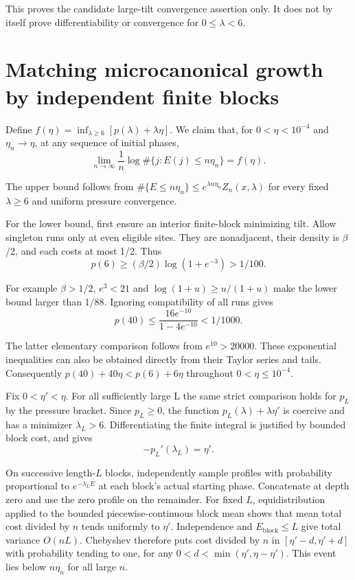 \documentclass[11pt,letterpaper]{article}
\begin{document}
This proves the candidate large-tilt convergence assertion only. It does not by itself prove differentiability or convergence for $0\le\lambda<6$.

\section{Matching microcanonical growth by independent finite blocks}

Define $f(\eta)=\inf_{\lambda\ge6}[p(\lambda)+\lambda\eta]$. We claim that, for $0<\eta<10^{-4}$ and $\eta_n\to\eta$, at any sequence of initial phases,
\[
\lim_{n\to\infty}\frac1n\log\#\{j:E(j)\le n\eta_n\}=f(\eta).
\]

The upper bound follows from $\#\{E\le n\eta_n\}\le e^{\lambda n\eta_n}Z_n(x,\lambda)$ for every fixed $\lambda\ge6$ and uniform pressure convergence.

For the lower bound, first ensure an interior finite-block minimizing tilt. Allow singleton runs only at even eligible sites. They are nonadjacent, their density is $\beta$/2, and each costs at most 1/2. Thus
\[
p(6)\ge(\beta/2)\log(1+e^{-3})>1/100.
\]

For example $\beta>1/2$, $e^3<21$ and $\log(1+u)\ge u/(1+u)$ make the lower bound larger than 1/88. Ignoring compatibility of all runs gives
\[
p(40)\le\frac{16e^{-10}}{1-4e^{-10}}<1/1000.
\]

The latter elementary comparison follows from $e^{10}>20000$. These exponential inequalities can also be obtained directly from their Taylor series and tails. Consequently $p(40)+40\eta<p(6)+6\eta$ throughout $0<\eta\le10^{-4}$.

Fix $0<\eta'<\eta$. For all sufficiently large L the same strict comparison holds for $p_L$ by the pressure bracket. Since $p_L\ge0$, the function $p_L(\lambda)+\lambda\eta'$ is coercive and has a minimizer $\lambda_L>6$. Differentiating the finite integral is justified by bounded block cost, and gives
\[
-p_L'(\lambda_L)=\eta'.
\]

On successive length-$L$ blocks, independently sample profiles with probability proportional to $e^{-\lambda_L E}$ at each block's actual starting phase. Concatenate at depth zero and use the zero profile on the remainder. For fixed $L$, equidistribution applied to the bounded piecewise-continuous block mean shows that mean total cost divided by $n$ tends uniformly to $\eta'$. Independence and $E_{\mathrm{block}}\le L$ give total variance $O(nL)$. Chebyshev therefore puts cost divided by $n$ in $[\eta'-d,\eta'+d]$ with probability tending to one, for any $0<d<\min(\eta',\eta-\eta')$. This event lies below $n\eta_n$ for all large $n$.
\end{document}
